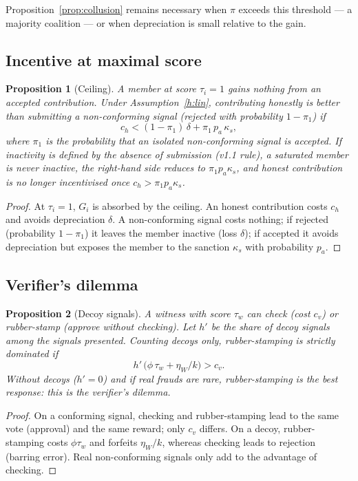 \documentclass[11pt,a4paper]{article}
\theoremstyle{plain}
\newtheorem{proposition}{Proposition}
\theoremstyle{definition}
\theoremstyle{remark}
\newcommand{\1}{\mathbf{1}}
\begin{document}
Proposition~\ref{prop:collusion} remains necessary when $\pi$ exceeds this
threshold --- a majority coalition --- or when depreciation is small relative to
the gain.

\subsection{Incentive at maximal score}

\begin{proposition}[Ceiling]\label{prop:ceiling}
A member at score $\tau_i=1$ gains nothing from an accepted contribution. Under
Assumption~\ref{h:lin}, contributing honestly is better than submitting a
non-conforming signal (rejected with probability $1-\pi_1$) if
\begin{equation}
c_h<(1-\pi_1)\,\delta+\pi_1\,p_a\,\kappa_s,
\label{eq:ceiling}
\end{equation}
where $\pi_1$ is the probability that an isolated non-conforming signal is
accepted. If inactivity is defined by the absence of \emph{submission} (v1.1
rule), a saturated member is never inactive, the right-hand side reduces to
$\pi_1 p_a\kappa_s$, and honest contribution is no longer incentivised once
$c_h>\pi_1p_a\kappa_s$.
\end{proposition}
\begin{proof}
At $\tau_i=1$, $G_i$ is absorbed by the ceiling. An honest contribution costs
$c_h$ and avoids depreciation $\delta$. A non-conforming signal costs nothing;
if rejected (probability $1-\pi_1$) it leaves the member inactive (loss
$\delta$); if accepted it avoids depreciation but exposes the member to the
sanction $\kappa_s$ with probability $p_a$.
\end{proof}

\subsection{Verifier's dilemma}

\begin{proposition}[Decoy signals]\label{prop:verif}
A witness with score $\tau_w$ can \emph{check} (cost $c_v$) or
\emph{rubber-stamp} (approve without checking). Let $h'$ be the share of decoy
signals among the signals presented. Counting decoys only, rubber-stamping is
strictly dominated if
\begin{equation}
h'\,\bigl(\phi\,\tau_w+\eta_W/k\bigr)>c_v.
\label{eq:verif}
\end{equation}
Without decoys ($h'=0$) and if real frauds are rare, rubber-stamping is the
best response: this is the verifier's dilemma.
\end{proposition}
\begin{proof}
On a conforming signal, checking and rubber-stamping lead to the same vote
(approval) and the same reward; only $c_v$ differs. On a decoy,
rubber-stamping costs $\phi\tau_w$ and forfeits $\eta_W/k$, whereas checking
leads to rejection (barring error). Real non-conforming signals only add to the
advantage of checking.
\end{proof}
\end{document}

